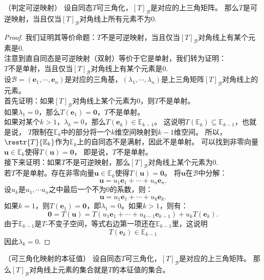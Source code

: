 \documentclass[12pt,UTF8]{ctexbook}
\begin{document}
\begin{pp}（判定可逆映射）\label{pp:6_6}
    设自同态$T$可三角化，$[T]_\mathcal{B}$是对应的上三角矩阵。
    那么$T$是可逆映射，当且仅当$[T]_\mathcal{B}$对角线上所有元素不为0.
\end{pp}
\begin{proof} %
    我们证明其等价命题：$T$不是可逆映射，当且仅当$[T]_\mathcal{B}$对角线上有某个元素是0.\\
    注意到直自同态是可逆映射（双射）等价于它是单射，我们转为证明：\\
    $T$不是单射，当且仅当$[T]_\mathcal{B}$对角线上有某个元素是0.\\
    设$\mathcal{B} = (\mathbf{e}_1, \cdots , \mathbf{e}_n)$是对应的三角基，$(\lambda_1, \cdots , \lambda_n)$是上三角矩阵$[T]_\mathcal{B}$对角线上的元素。\\
    首先证明：如果$[T]_\mathcal{B}$对角线上某个元素为0，则$T$不是单射。\\
    如果$\lambda_1 = 0$，那么$T(\mathbf{e}_1) = \mathbf{0}$，$T$不是单射。\\
    如果对某个$k>1$，$\lambda_k = 0$，那么$T(\mathbf{e}_k) \in \mathbb{E}_{k-1}$。
    这说明$T(\mathbb{E}_k) \subseteq \mathbb{E}_{k-1}$，也就是说，
    $T$限制在$\mathbb{E}_k$中的部分将一个$k$维空间映射到$k-1$维空间。
    所以，$\restr{T}{\mathbb{E}_k}$作为$\mathbb{E}_k$上的自同态不是满射，因此不是单射。
    可以找到非零向量$\mathbf{u} \in \mathbb{E}_k$使得$T(\mathbf{u}) = \mathbf{0}$，
    即是说，$T$不是单射。\\
    接下来证明：如果$T$不是可逆映射，那么$[T]_\mathcal{B}$对角线上某个元素为0.\\
    若$T$不是单射。存在非零向量$\mathbf{u} \in \mathbb{E}_k$使得$T(\mathbf{u}) = \mathbf{0}$。
    将$\mathbf{u}$在$\mathcal{B}$中分解：
    $$ \mathbf{u} = u_1 \mathbf{e}_1 + \cdots + u_n \mathbf{e}_n.$$
    设$u_k$是$u_1, \cdots u_n$之中最后一个不为0的系数，则：
    $$ \mathbf{u} = u_1 \mathbf{e}_1 + \cdots + u_k \mathbf{e}_k.$$
    如果$k=1$，则$T(\mathbf{e}_1) = \mathbf{0}$，即$\lambda_1 = 0$。如果$k > 1$，则有：
    $$ \mathbf{0} = T(\mathbf{u}) = T(u_1 \mathbf{e}_1 + \cdots + u_{k-1} \mathbf{e}_{k-1}) +  u_k T(\mathbf{e}_k).$$
    由于$\mathbb{E}_{k-1}$是$T$-不变子空间，等式右边第一项还在$\mathbb{E}_{k-1}$里，这说明
    $$ T(\mathbf{e}_k) \in \mathbb{E}_{k-1}$$
    因此$\lambda_k = 0.$

\end{proof}


\begin{pp}（可三角化映射的本征值）\label{pp:6_7}
    设自同态$T$可三角化，$[T]_\mathcal{B}$是对应的上三角矩阵。
    那么$[T]_\mathcal{B}$对角线上元素的集合就是$T$的本征值的集合。
\end{pp}
\end{document}
